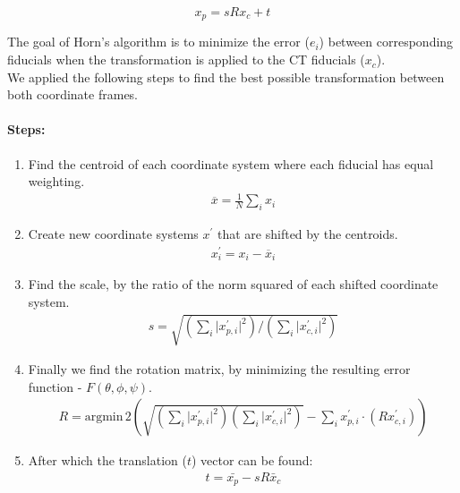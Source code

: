 \documentclass[12pt]{article}
\begin{document}
\begin{equation*}
    x_p = sRx_c + t
\end{equation*}

The goal of Horn's algorithm is to minimize the error (\(e_i\)) between corresponding fiducials when the transformation is applied to the CT fiducials ($x_c$).\\

We applied the following steps to find the best possible transformation between both coordinate frames.

\paragraph{Steps:}
\begin{enumerate}
    \item Find the centroid of each coordinate system where each fiducial has equal weighting. 
    \begin{align*}
        \overline{x}  = \frac{1}{N} \sum_i x_i 
    \end{align*}
    \item Create new coordinate systems \(x^{\prime}\) that are shifted by the centroids.
    \begin{align*}
        x^{\prime}_i = x_i - \overline{x}_i 
    \end{align*}
    \item Find the scale, by the ratio of the norm squared of each shifted coordinate system. 
    \begin{align*}
        s = \sqrt{\left( \sum_{i} \vert x^{\prime}_{p,i} \vert ^{2}  \right) \bigg/ \left( \sum_{i} \vert x^{\prime}_{c,i} \vert ^{2}  \right)} 
    \end{align*}
    \item Finally we find the rotation matrix, by minimizing the resulting error function - \(F(\theta ,\phi, \psi)\).
    \begin{align*}
        R = \text{argmin} \,2 \left( \sqrt{\left( \sum_{i} \vert x^{\prime}_{p,i} \vert ^{2}  \right) \left( \sum_{i} \vert x^{\prime}_{c,i} \vert ^{2}  \right)}  - \sum_{i}  x^{\prime}_{p,i} \cdot \left( R x^{\prime}_{c,i} \right) \right) 
    \end{align*}
    \item After which the translation ($t$) vector can be found:
    \begin{align*}
        t = \bar{x_p} - s R \bar{x}_c
    \end{align*}
\end{enumerate}
\end{document}
